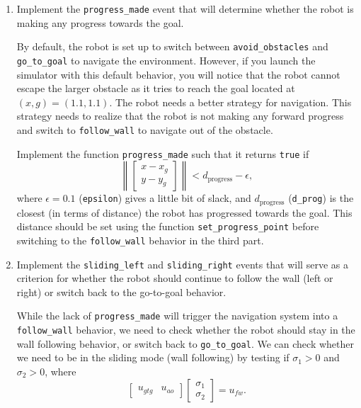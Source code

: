 \documentclass[10pt]{article}
\begin{document}
\begin{enumerate}
  \item Implement the \texttt{progress\_made} event that will determine whether the robot is making any progress towards the goal.
  
  By default, the robot is set up to switch between \texttt{avoid\_obstacles} and \texttt{go\_to\_goal} to navigate the environment. However, if you launch the simulator with this default behavior, you will notice that the robot cannot escape the larger obstacle as it tries to reach the goal located at $(x,g)=(1.1,1.1)$. The robot needs a better strategy for navigation. This strategy needs to realize that the robot is not making any forward progress and switch to \texttt{follow\_wall} to navigate out of the obstacle.
  
  Implement the function \texttt{progress\_made} such that it returns \texttt{true} if
  \begin{equation*}
    \left\|\begin{bmatrix} x-x_g \\ y-y_g \end{bmatrix}\right\| < d_{\text{progress}}-\epsilon,
  \end{equation*}
  where $\epsilon=0.1$ (\texttt{epsilon}) gives a little bit of slack, and $d_{\text{progress}}$ (\texttt{d\_prog}) is the closest (in terms of distance) the robot has progressed towards the goal. This distance should be set using the function \texttt{set\_progress\_point} before switching to the \texttt{follow\_wall} behavior in the third part.

  \item Implement the \texttt{sliding\_left} and \texttt{sliding\_right} events that will serve as a criterion for whether the robot should continue to follow the wall (left or right) or switch back to the go-to-goal behavior.
  
  While the lack of \texttt{progress\_made} will trigger the navigation system into a \texttt{follow\_wall} behavior, we need to check whether the robot should stay in the wall following behavior, or switch back to \texttt{go\_to\_goal}. We can check whether we need to be in the sliding mode (wall following) by testing if $\sigma_1>0$ and $\sigma_2>0$, where
  \begin{equation*}
    \begin{bmatrix}u_{gtg} & u_{ao}\end{bmatrix}\begin{bmatrix}\sigma_1 \\ \sigma_2\end{bmatrix} = u_{fw}.
  \end{equation*}
  

\end{enumerate}
\end{document}
